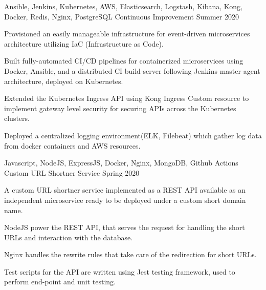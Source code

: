 \begin{cventries}
  \cventry
    {Ansible, Jenkins, Kubernetes, AWS, Elasticsearch, Logstash, Kibana, Kong, Docker, Redis, Nginx, PostgreSQL} %
    {Continuous Improvement} %
    {} %
    {Summer 2020} %
    {
      \begin{cvitems} %
        \item {Provisioned an easily manageable infrastructure for event-driven microservices architecture utilizing IaC (Infrastructure as Code).}
        \item {Built fully-automated CI/CD pipelines for containerized microservices using Docker, Ansible, and a distributed CI build-server following Jenkins master-agent architecture, deployed on Kubernetes.}
        \item {Extended the Kubernetes Ingress API using Kong Ingress Custom resource to implement gateway level security for securing APIs across the Kubernetes clusters.}
        \item {Deployed a centralized logging environment(ELK, Filebeat) which gather log data from docker containers and AWS resources.}
      \end{cvitems}
    }

  \cventry
    {Javascript, NodeJS, ExpressJS, Docker, Nginx, MongoDB, Github Actions} %
    {Custom URL Shortner Service} %
    {} %
    {Spring 2020} %
    {
      \begin{cvitems} %
        \item {A custom URL shortner service implemented as a REST API available as an independent microservice ready to be deployed under a custom short domain name.}
        \item {NodeJS power the REST API, that serves the request for handling the short URLs and interaction with the database.}
        \item {Nginx handles the rewrite rules that take care of the redirection for short URLs.}
        \item {Test scripts for the API are written using Jest testing framework, used to perform end-point and unit testing.}
      \end{cvitems}
    }


\end{cventries}
